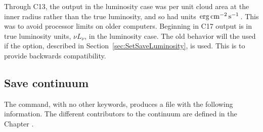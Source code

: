 Through C13, the  output 
in the luminosity case was per unit
cloud area at the inner radius rather than the true luminosity,
and so had units $\mbox{${\rm\thinspace erg}{\rm\thinspace cm}^{-2}{\rm\thinspace s}^{-1}\,$}$.
This was to avoid processor limits on older computers.
Beginning in C17 output is in true luminosity units, $\nu L_\nu$, in the luminosity case.
The old behavior will the used if the
 option, described in
Section~\ref{sec:SetSaveLuminosity}, is used.
This is to provide backwards compatibility.

\subsection{Save continuum}

The  command,
with no other keywords,
produces a file
with the following information.
The different contributors to the continuum
are defined in the Chapter .

